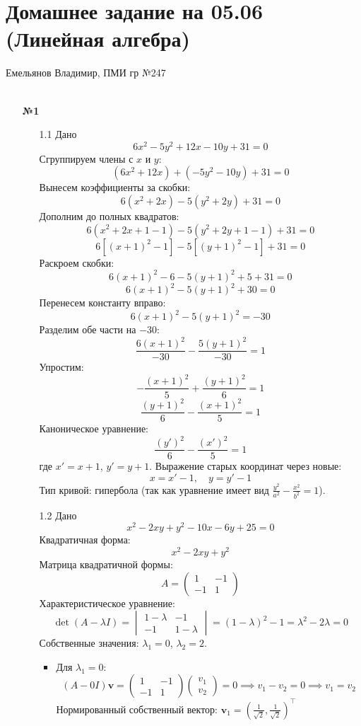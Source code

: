 \documentclass[a4paper]{article}
\begin{document}
\section*{Домашнее задание на 05.06 (Линейная алгебра)}
{\large Емельянов Владимир, ПМИ гр №247}\\\\
\begin{enumerate}
  \item[\textbf{№1}]\begin{enumerate}
    \item[1.1]Дано
    \[6x^2 - 5y^2 + 12x - 10y + 31 = 0\]
    Сгруппируем члены с \(x\) и \(y\):  
    \[(6x^2 + 12x) + (-5y^2 - 10y) + 31 = 0\]  
    Вынесем коэффициенты за скобки:  
    \[6(x^2 + 2x) - 5(y^2 + 2y) + 31 = 0\]  
    Дополним до полных квадратов:  
    \[6(x^2 + 2x + 1 - 1) - 5(y^2 + 2y + 1 - 1) + 31 = 0\]  
    \[6[(x + 1)^2 - 1] - 5[(y + 1)^2 - 1] + 31 = 0\]  
    Раскроем скобки:  
    \[6(x + 1)^2 - 6 - 5(y + 1)^2 + 5 + 31 = 0\]  
    \[6(x + 1)^2 - 5(y + 1)^2 + 30 = 0\]  
    Перенесем константу вправо:  
    \[6(x + 1)^2 - 5(y + 1)^2 = -30\]  
    Разделим обе части на \(-30\):  
    \[\frac{6(x + 1)^2}{-30} - \frac{5(y + 1)^2}{-30} = 1\]  
    Упростим:  
    \[-\frac{(x + 1)^2}{5} + \frac{(y + 1)^2}{6} = 1\]  
    \[\frac{(y + 1)^2}{6} - \frac{(x + 1)^2}{5} = 1\]  
    Каноническое уравнение:  
    \[\frac{(y')^2}{6} - \frac{(x')^2}{5} = 1\]  
    где \(x' = x + 1\), \(y' = y + 1\).  
    Выражение старых координат через новые:  
    \[x = x' - 1, \quad y = y' - 1\]  
    Тип кривой: гипербола (так как уравнение имеет вид \(\frac{y^2}{a^2} - \frac{x^2}{b^2} = 1\)).\\

    \item[1.2]Дано
    \[x^2 - 2xy + y^2 - 10x - 6y + 25 = 0\]
    Квадратичная форма: \[ x^2 - 2xy + y^2 \] 
    Матрица квадратичной формы:  
    \[
    A = \begin{pmatrix}
    1 & -1 \\
    -1 & 1
    \end{pmatrix}
    \]  
    Характеристическое уравнение:  
    \[
    \det(A - \lambda I) = \begin{vmatrix}
    1 - \lambda & -1 \\
    -1 & 1 - \lambda
    \end{vmatrix} = (1 - \lambda)^2 - 1 = \lambda^2 - 2\lambda = 0
    \]  
    Собственные значения: \( \lambda_1 = 0 \), \( \lambda_2 = 2 \).
    \begin{itemize}
    \item Для \( \lambda_1 = 0 \):  
    \[
    (A - 0I)\mathbf{v} = \begin{pmatrix} 1 & -1 \\ -1 & 1 \end{pmatrix}
      \begin{pmatrix} v_1 \\ v_2 \end{pmatrix} = 0 \implies v_1 - v_2 =
      0 \implies v_1 = v_2
    \]  
    Нормированный собственный вектор:
      \( \mathbf{v}_1 = \left( \frac{1}{\sqrt{2}}, \frac{1}{\sqrt{2}} \right)^\top \)  
    

\end{itemize}
\end{enumerate}
\end{enumerate}
\end{document}
